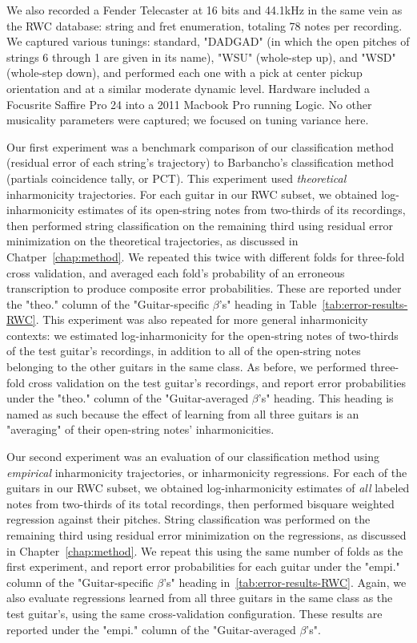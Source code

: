 \documentclass[12pt]{cmuthesis}
\begin{document}
We also recorded a Fender Telecaster at 16 bits and 44.1kHz in the same vein as the RWC database: string and fret enumeration, totaling 78 notes per recording. We captured various tunings: standard, "DADGAD" (in which the open pitches of strings 6 through 1 are given in its name), "WSU" (whole-step up), and "WSD" (whole-step down), and performed each one with a pick at center pickup orientation and at a similar moderate dynamic level. Hardware included a Focusrite Saffire Pro 24 into a 2011 Macbook Pro running Logic. No other musicality parameters were captured; we focused on tuning variance here.

Our first experiment was a benchmark comparison of our classification method (residual error of each string's trajectory) to Barbancho's classification method (partials coincidence tally, or PCT). This experiment used \textit{theoretical} inharmonicity trajectories. For each guitar in our RWC subset, we obtained log-inharmonicity estimates of its open-string notes from two-thirds of its recordings, then performed string classification on the remaining third using residual error minimization on the theoretical trajectories, as discussed in Chatper~\ref{chap:method}. We repeated this twice with different folds for three-fold cross validation, and averaged each fold's probability of an erroneous transcription to produce composite error probabilities. These are reported under the "theo." column of the "Guitar-specific $\beta$'s" heading in Table~\ref{tab:error-results-RWC}. This experiment was also repeated for more general inharmonicity contexts: we estimated log-inharmonicity for the open-string notes of two-thirds of the test guitar's recordings, in addition to all of the open-string notes belonging to the other guitars in the same class. As before, we performed three-fold cross validation on the test guitar's recordings, and report error probabilities under the "theo." column of the "Guitar-averaged $\beta$'s" heading. This heading is named as such because the effect of learning from all three guitars is an "averaging" of their open-string notes' inharmonicities.

Our second experiment was an evaluation of our classification method using \textit{empirical} inharmonicity trajectories, or inharmonicity regressions. For each of the guitars in our RWC subset, we obtained log-inharmonicity estimates of \textit{all} labeled notes from two-thirds of its total recordings, then performed bisquare weighted regression against their pitches. String classification was performed on the remaining third using residual error minimization on the regressions, as discussed in Chapter~\ref{chap:method}. We repeat this using the same number of folds as the first experiment, and report error probabilities for each guitar under the "empi." column of the "Guitar-specific $\beta$'s" heading in~\ref{tab:error-results-RWC}. Again, we also evaluate regressions learned from all three guitars in the same class as the test guitar's, using the same cross-validation configuration. These results are reported under the "empi." column of the "Guitar-averaged $\beta$'s".
\end{document}
